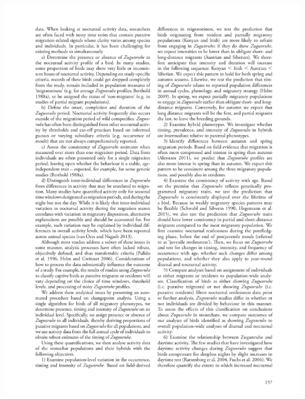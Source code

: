 \documentclass[a4paper, twoside]{templates/ociamthesis}
\begin{document}
\begin{center}\includegraphics[width=1\linewidth]{pdf_chapters/zug/zug_crop_Part03} \end{center}
\end{document}
